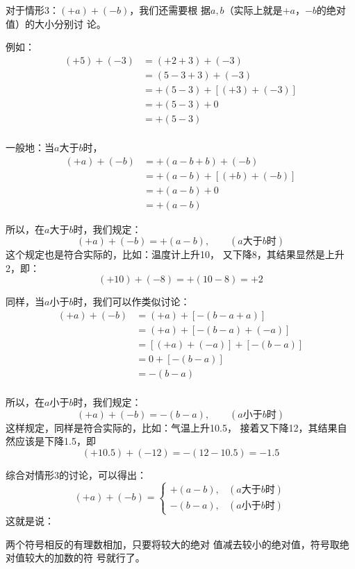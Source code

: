 对于情形3：$(+a)+(-b)$，我们还需要根
据$a,b$（实际上就是$+a$，$-b$的绝对值）的大小分别讨
论。

例如：
\begin{align*}
(+5)+(-3)&=(+2+3)+(-3)\\
&=(5-3 + 3)+(-3)\\
&=+(5-3)+[(+3)+(-3)]\tag{加法结合律}\\
&=+(5-3)+0 \tag{相反数的性质}\\
&=+(5-3)\tag{零的特性}\\
\end{align*}

一般地：当$a$大于$b$时，
\begin{align*}
(+ a)+(-b)&=+(a-b + b)+(-b)\\
&=+(a-b)+[(+b)+(-b)]    \tag{加法结合律}\\
& =+(a-b) + 0 \tag{零的特性}\\
&  =+(a-b)
\end{align*}

所以，在$a$大于$b$时，我们规定：
\[(+a)+(-b)=+(a-b),\qquad (\text{$a$大于$b$时})\]
这个规定也是符合实际的，比如：温度计上升10\oc，
又下降8\oc，其结果显然是上升2\oc，即：
\[     (+10)+(-8)=+(10-8)=+2\]

同样，当$a$小于$b$时，我们可以作类似讨论：
\begin{align*}
(+ a)+(-b)&=(+ a)+[-(b-a+a)]\\
& =(+ a)+[-(b-a)+( -a)]   \tag{情形2加法法则}\\
&=[(+ a)+(-a)]+[-(b-a) ]  \tag{加法交换、结合律}\\
&=0+[-(b-a)]\tag{相反数的特性}\\
&=-(b-a)\tag{零的特性}\\
\end{align*}


所以，在$a$小于$b$时，我们规定：
\[(+a)+(-b)=-(b-a),\qquad (\text{$a$小于$b$时})\]
这样规定，同样是符合实际的，比如：气温上升10.5\oc，
接着又下降12\oc，其结果自然应该是下降1.5\oc，即
\[(+10.5)+(-12)=-(12-10.5)=-1.5\]

综合对情形3的讨论，可以得出：
\[(+a)+(-b)=\begin{cases}
+(a-b),& (\text{$a$大于$b$时})\\
-(b-a),& (\text{$a$小于$b$时})
\end{cases}\]
这就是说：

\begin{blk}{}
	两个符号相反的有理数相加，只要将较大的绝对
	值减去较小的绝对值，符号取绝对值较大的加数的符
	号就行了。
\end{blk}

